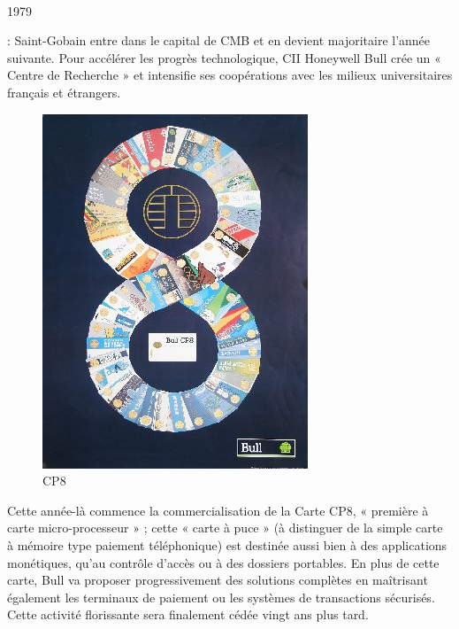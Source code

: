 \documentclass{article}
\begin{document}
		\paragraph{}
		\begin{bf}1979\end{bf}: Saint-Gobain entre dans le capital de CMB et en devient majoritaire l’année suivante. Pour 
		accélérer les progrès technologique, CII Honeywell Bull crée un « Centre de Recherche » et intensifie ses coopérations 
		avec les milieux universitaires français et étrangers.\newline{}
		\begin{figure}
		\includegraphics[scale=0.25]{cp8_affiche_vf.jpg}
		\caption{CP8}
		\end{figure}
		Cette année-là commence la commercialisation de la Carte CP8, « première à carte micro-processeur » ; cette « carte à 
		puce » (à distinguer de la simple carte à mémoire type paiement téléphonique) est destinée aussi bien à des 
		applications monétiques, qu’au contrôle d’accès ou à des dossiers portables. En plus de cette carte, Bull va proposer 
		progressivement des solutions complètes en maîtrisant également les terminaux de paiement ou les systèmes de 
		transactions sécurisés. Cette activité florissante sera finalement cédée vingt ans plus tard.
		\newline{}
		\newline{}
		\newline{}
		\newline{}
		\newline{}
\end{document}
